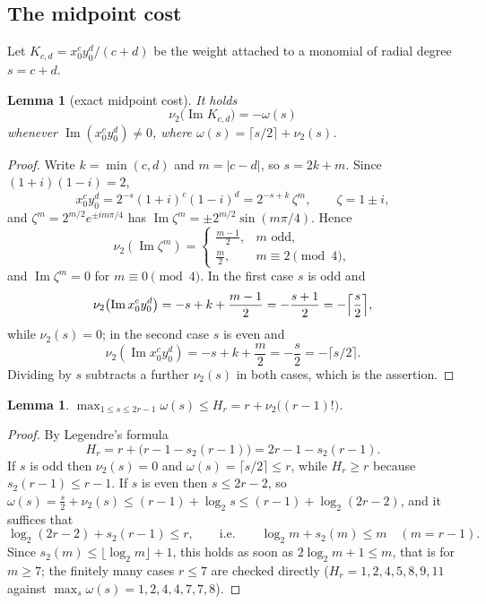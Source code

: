 \documentclass[10pt,a4paper]{amsart}
\newtheorem{lemma}[theorem]{Lemma}
\begin{document}
\subsection{The midpoint cost}

Let $K_{c,d}=x_0^cy_0^d/(c+d)$ be the weight attached to a monomial of radial degree $s=c+d$.

\begin{lemma}[exact midpoint cost]\label{lem:cost}
It holds
\[
\nu_2\bigl(\operatorname{Im}K_{c,d}\bigr)=-\omega(s)
\]
whenever $\operatorname{Im}(x_0^cy_0^d)\ne0$, where $\omega(s)=\lceil s/2\rceil+\nu_2(s)$.
\end{lemma}

\begin{proof}
Write $k=\min(c,d)$ and $m=|c-d|$, so $s=2k+m$.  Since $(1+i)(1-i)=2$,
\[
  x_0^cy_0^d=2^{-s}(1+i)^c(1-i)^d=2^{-s+k}\,\zeta^{m},  \qquad \zeta=1\pm i ,
\]
and $\zeta^m=2^{m/2}e^{\pm im\pi/4}$ has $\operatorname{Im}\zeta^m=\pm2^{m/2}\sin(m\pi/4)$.  Hence
\[
\nu_2(\operatorname{Im}\zeta^m) = \begin{cases} \frac{m-1}2,  & m \text{ odd}, \\  \frac m2, & m\equiv2\pmod4, \end{cases}
\]
  and $\operatorname{Im}\zeta^m=0$ for $m\equiv0\pmod4$.  In the first case $s$ is odd and
\[
  \nu_2\bigl(\operatorname{Im}x_0^cy_0^d\bigr)  =-s+k+\frac{m-1}2=-\frac{s+1}2=-\Bigl\lceil\frac s2\Bigr\rceil ,
\]
while $\nu_2(s)=0$; in the second case $s$ is even and
\[
\nu_2(\operatorname{Im}x_0^cy_0^d)=-s+k+\frac m2=-\frac s2 =-\lceil s/2\rceil.
\]
Dividing by $s$ subtracts a further $\nu_2(s)$ in both cases, which is the assertion.
\end{proof}

\begin{lemma}\label{lem:omega}
$\max_{1\le s\le 2r-1}\omega(s)\le H_r=r+\nu_2\bigl((r-1)!\bigr)$.
\end{lemma}

\begin{proof}
By Legendre's formula
\[
H_r=r+\bigl(r-1-s_2(r-1)\bigr)=2r-1-s_2(r-1).
\]
If $s$ is odd then $\nu_2(s)=0$ and $\omega(s)=\lceil s/2\rceil\le r$, while $H_r\ge r$ because $s_2(r-1)\le r-1$.  If $s$ is even then $s\le2r-2$, so
$\omega(s)=\frac s2+\nu_2(s)\le(r-1)+\log_2 s\le(r-1)+\log_2(2r-2)$, and it suffices that
\[
  \log_2(2r-2)+s_2(r-1)\le r ,
  \qquad\text{i.e.}\qquad \log_2m+s_2(m)\le m\quad(m=r-1).
\]
Since $s_2(m)\le\lfloor\log_2m\rfloor+1$, this holds as soon as $2\log_2m+1\le m$, that is for $m\ge7$; the finitely many cases $r\le7$ are
checked directly ($H_r=1,2,4,5,8,9,11$ against $\max_s\omega(s)=1,2,4,4,7,7,8$).
\end{proof}
\end{document}
